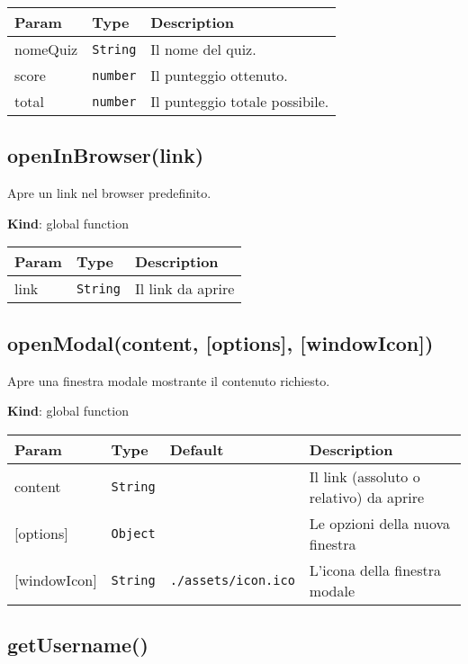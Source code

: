 \begin{tabularx}{\textwidth}{XXX}
\toprule
Param & Type & Description\tabularnewline
\midrule
\endhead
nomeQuiz & \texttt{String} & Il nome del quiz.\tabularnewline
score & \texttt{number} & Il punteggio ottenuto.\tabularnewline
total & \texttt{number} & Il punteggio totale possibile.\tabularnewline
\bottomrule
\end{tabularx}

\protect\hypertarget{openInBrowser}{}{}

\hypertarget{openinbrowserlink}{%
\subsection{openInBrowser(link)}\label{openinbrowserlink}}

Apre un link nel browser predefinito.

\textbf{Kind}: global function

\begin{tabularx}{\textwidth}{XXX}
\toprule
Param & Type & Description\tabularnewline
\midrule
\endhead
link & \texttt{String} & Il link da aprire\tabularnewline
\bottomrule
\end{tabularx}

\protect\hypertarget{openModal}{}{}

\hypertarget{openmodalcontent-options-windowicon}{%
\subsection{openModal(content, {[}options{]},
{[}windowIcon{]})}\label{openmodalcontent-options-windowicon}}

Apre una finestra modale mostrante il contenuto richiesto.

\textbf{Kind}: global function

\begin{tabularx}{\textwidth}{XXXX}
\toprule
Param & Type & Default & Description\tabularnewline
\midrule
\endhead
content & \texttt{String} & & Il link (assoluto o relativo) da
aprire\tabularnewline
{[}options{]} & \texttt{Object} & & Le opzioni della nuova
finestra\tabularnewline
{[}windowIcon{]} & \texttt{String} & \texttt{./assets/icon.ico} &
L'icona della finestra modale\tabularnewline
\bottomrule
\end{tabularx}

\protect\hypertarget{getUsername}{}{}

\hypertarget{getusername}{%
\subsection{getUsername()}\label{getusername}}


